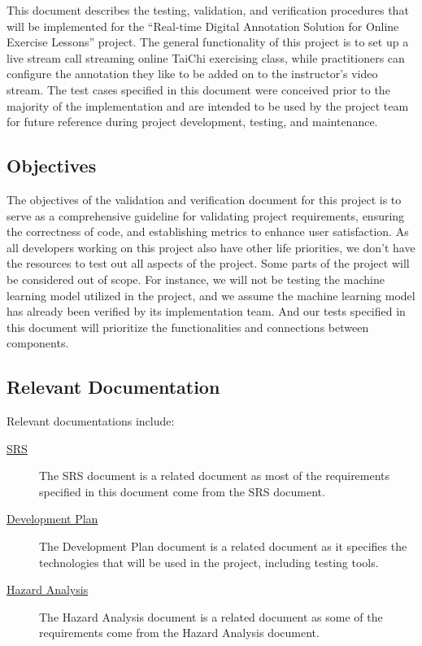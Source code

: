 \documentclass[12pt, titlepage]{article}
\begin{document}
This document describes the testing, validation, and verification procedures
that will be implemented for the “Real-time Digital Annotation Solution for
Online Exercise Lessons” project. The general functionality of this project is
to set up a live stream call streaming online TaiChi exercising class, while
practitioners can configure the annotation they like to be added on to the
instructor’s video stream. The test cases specified in this document were
conceived prior to the majority of the implementation and are intended to be
used by the project team for future reference during project development,
testing, and maintenance.

\subsection{Objectives}

The objectives of the validation and verification document for this project is
to serve as a comprehensive guideline for validating project requirements,
ensuring the correctness of code, and establishing metrics to enhance user
satisfaction. As all developers working on this project also have other life
priorities, we don’t have the resources to test out all aspects of the project.
Some parts of the project will be considered out of scope. For instance, we will
not be testing the machine learning model utilized in the project, and we assume
the machine learning model has already been verified by its implementation team.
And our tests specified in this document will prioritize the functionalities and
connections between components.

\subsection{Relevant Documentation}

Relevant documentations include:
\begin{description}
\item[\href{https://github.com/InfiniView-AI/MotionMingle/blob/main/docs/SRS/SRS.pdf}{SRS}]
  The SRS document is a related document as most of the requirements specified
  in this document come from the SRS document.
\item[\href{https://github.com/InfiniView-AI/MotionMingle/blob/main/docs/DevelopmentPlan/DevelopmentPlan.pdf}{Development Plan}]
  The Development Plan document is a related document as it specifies the
  technologies that will be used in the project, including testing tools.
\item[\href{https://github.com/InfiniView-AI/MotionMingle/blob/main/docs/HazardAnalysis/HazardAnalysis.pdf}{Hazard Analysis}]
  The Hazard Analysis document is a related document as some of the requirements
  come from the Hazard Analysis document.
\end{description}
\end{document}
